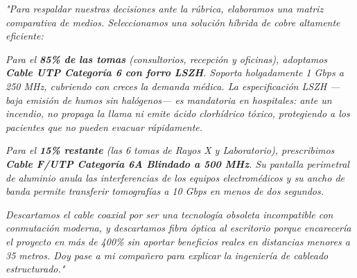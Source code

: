 \documentclass[11pt,a4paper]{article}
\begin{document}
\begin{tcolorbox}[colback=white,colframe=primaryblue,title=\textbf{Speech Verbal del Integrante 3 (Guion Palabra por Palabra)}]
\textit{"Para respaldar nuestras decisiones ante la rúbrica, elaboramos una matriz comparativa de medios. Seleccionamos una solución híbrida de cobre altamente eficiente:}\par\vspace{2mm}
\textit{Para el \textbf{85\% de las tomas} (consultorios, recepción y oficinas), adoptamos \textbf{Cable UTP Categoría 6 con forro LSZH}. Soporta holgadamente 1 Gbps a 250 MHz, cubriendo con creces la demanda médica. La especificación LSZH —baja emisión de humos sin halógenos— es mandatoria en hospitales: ante un incendio, no propaga la llama ni emite ácido clorhídrico tóxico, protegiendo a los pacientes que no pueden evacuar rápidamente.}\par\vspace{2mm}
\textit{Para el \textbf{15\% restante} (las 6 tomas de Rayos X y Laboratorio), prescribimos \textbf{Cable F/UTP Categoría 6A Blindado a 500 MHz}. Su pantalla perimetral de aluminio anula las interferencias de los equipos electromédicos y su ancho de banda permite transferir tomografías a 10 Gbps en menos de dos segundos.}\par\vspace{2mm}
\textit{Descartamos el cable coaxial por ser una tecnología obsoleta incompatible con conmutación moderna, y descartamos fibra óptica al escritorio porque encarecería el proyecto en más de 400\% sin aportar beneficios reales en distancias menores a 35 metros. Doy pase a mi compañero para explicar la ingeniería de cableado estructurado."}
\end{tcolorbox}

\vspace{0.5cm}

\end{document}
